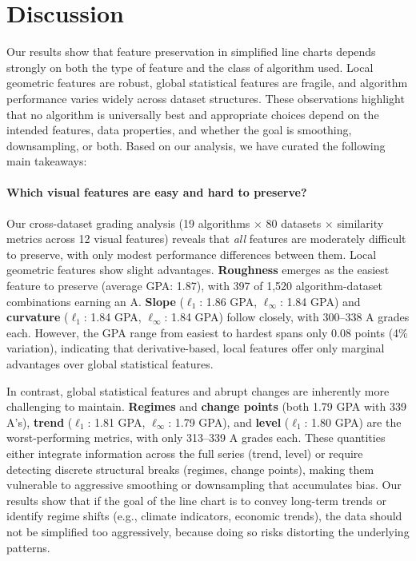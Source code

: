 \section{Discussion}
\label{sec:discussion}
Our results show that feature preservation in simplified line charts depends strongly on both the type of feature and the class of algorithm used. Local geometric features are robust, global statistical features are fragile, and algorithm performance varies widely across dataset structures. These observations highlight that no algorithm is universally best and appropriate choices depend on the intended features, data properties, and whether the goal is smoothing, downsampling, or both. Based on our analysis, we have curated the following main takeaways: 

\paragraph{\textbf{Which visual features are easy and hard to preserve?}}
Our cross-dataset grading analysis (19 algorithms $\times$ 80 datasets $\times$ similarity metrics across 12 visual features) reveals that \emph{all} features are moderately difficult to preserve, with only modest performance differences between them. Local geometric features show slight advantages. \textbf{Roughness} emerges as the easiest feature to preserve (average GPA: 1.87), with 397 of 1,520 algorithm-dataset combinations earning an A. \textbf{Slope} ($\ell_1$: 1.86 GPA, $\ell_\infty$: 1.84 GPA) and \textbf{curvature} ($\ell_1$: 1.84 GPA, $\ell_\infty$: 1.84 GPA) follow closely, with 300--338 A grades each. However, the GPA range from easiest to hardest spans only 0.08 points (4\% variation), indicating that derivative-based, local features offer only marginal advantages over global statistical features.

In contrast, global statistical features and abrupt changes are inherently more challenging to maintain. \textbf{Regimes} and \textbf{change points} (both 1.79 GPA with 339 A's), \textbf{trend} ($\ell_1$: 1.81 GPA, $\ell_\infty$: 1.79 GPA), and \textbf{level} ($\ell_1$: 1.80 GPA) are the worst-performing metrics, with only 313--339 A grades each. These quantities either integrate information across the full series (trend, level) or require detecting discrete structural breaks (regimes, change points), making them vulnerable to aggressive smoothing or downsampling that accumulates bias. Our results show that if the goal of the line chart is to convey long-term trends or identify regime shifts (e.g., climate indicators, economic trends), the data should not be simplified too aggressively, because doing so risks distorting the underlying patterns.


